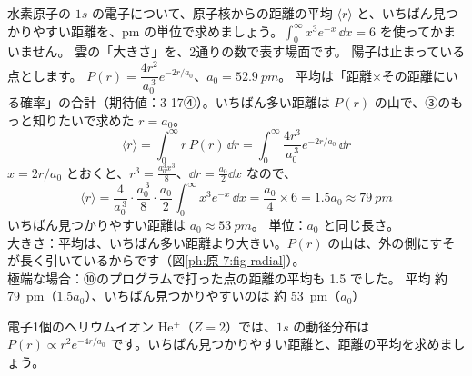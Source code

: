 \label{ph:原-7:ex3}
\begin{phreidai}
水素原子の $1s$ の電子について、原子核からの距離の平均 $\langle r\rangle$ と、いちばん見つかりやすい距離を、pm の単位で求めましょう。$\displaystyle\int_0^\infty x^3e^{-x}\,\dd x=6$ を使ってかまいません。
\phbamen
雲の「大きさ」を、2通りの数で表す場面です。
\phmushi
陽子は止まっている点とします。
\phzu
$P(r)=\dfrac{4r^2}{a_0^{\,3}}e^{-2r/a_0}$、$a_0=\qty{52.9}{pm}$。
\phriyu
平均は「距離×その距離にいる確率」の合計（期待値：3-17④）。いちばん多い距離は $P(r)$ の山で、③のもっと知りたいで求めた $r=a_0$。
\phtateru
\[ \langle r\rangle=\int_0^\infty r\,P(r)\,\dd r=\int_0^\infty\frac{4r^3}{a_0^{\,3}}e^{-2r/a_0}\,\dd r \]
\phtoku
$x=2r/a_0$ とおくと、$r^3=\tfrac{a_0^3x^3}{8}$、$\dd r=\tfrac{a_0}{2}\dd x$ なので、
\[ \langle r\rangle=\frac{4}{a_0^{\,3}}\cdot\frac{a_0^{\,3}}{8}\cdot\frac{a_0}{2}\int_0^\infty x^3e^{-x}\,\dd x=\frac{a_0}{4}\times6=1.5a_0\approx\qty{79}{pm} \]
いちばん見つかりやすい距離は $a_0\approx\qty{53}{pm}$。
\phtashikame
単位：$a_0$ と同じ長さ。\\
大きさ：平均は、いちばん多い距離より大きい。$P(r)$ の山は、外の側にすそが長く引いているからです（図\ref{ph:原-7:fig-radial}）。\\
極端な場合：⑩のプログラムで打った点の距離の平均も 1.5 でした。
\kotae 平均 約 \qty{79}{pm}（$1.5a_0$）、いちばん見つかりやすいのは 約 \qty{53}{pm}（$a_0$）
\end{phreidai}
\begin{jibun}
電子1個のヘリウムイオン He$^+$（$Z=2$）では、$1s$ の動径分布は $P(r)\propto r^2e^{-4r/a_0}$ です。いちばん見つかりやすい距離と、距離の平均を求めましょう。
\end{jibun}

